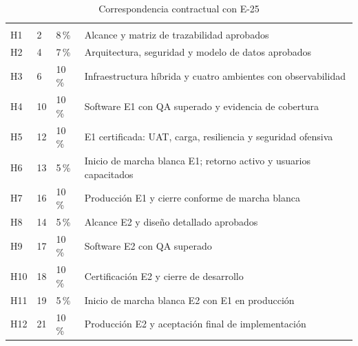 \begin{longtable}{L{12mm}R{12mm}R{14mm}L{110mm}}
\caption{Correspondencia contractual con E-25}\label{tab:sd7-e25}\\\hline
  &  &  & \\\hline\endfirsthead
\hline {} &  &  & \\\hline\endhead
H1 & 2 & 8\,\% & Alcance y matriz de trazabilidad aprobados \\\hline
H2 & 4 & 7\,\% & Arquitectura, seguridad y modelo de datos aprobados\\\hline
H3 & 6 & 10\,\% & Infraestructura híbrida y cuatro ambientes con observabilidad \\\hline
H4 & 10 & 10\,\% & Software E1 con QA superado y evidencia de cobertura\\\hline
H5 & 12 & 10\,\% & E1 certificada: UAT, carga, resiliencia y seguridad ofensiva \\\hline
H6 & 13 & 5\,\% & Inicio de marcha blanca E1; retorno activo y usuarios capacitados\\\hline
H7 & 16 & 10\,\% & Producción E1 y cierre conforme de marcha blanca \\\hline
H8 & 14 & 5\,\% & Alcance E2 y diseño detallado aprobados\\\hline
H9 & 17 & 10\,\% & Software E2 con QA superado \\\hline
H10 & 18 & 10\,\% & Certificación E2 y cierre de desarrollo\\\hline
H11 & 19 & 5\,\% & Inicio de marcha blanca E2 con E1 en producción \\\hline
H12 & 21 & 10\,\% & Producción E2 y aceptación final de implementación\\\hline
\end{longtable}
